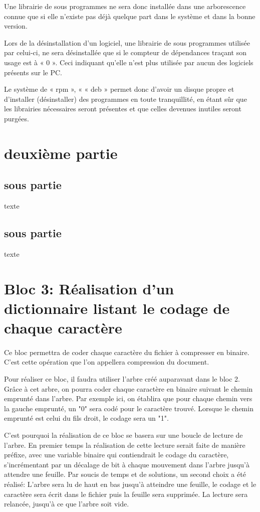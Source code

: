 \documentclass[a4paper,10pt]{article}
\begin{document}
Une librairie de sous programmes ne sera donc installée dans une arborescence connue que si elle n’existe pas déjà quelque part dans le système et dans la bonne version.

Lors de la désinstallation d’un logiciel, une librairie de sous programmes utilisée par celui-ci, ne sera désinstallée que si le compteur de dépendances traçant son usage est à « 0 ». Ceci indiquant qu’elle n’est plus utilisée par aucun des logiciels présents sur le PC.

Le système de « rpm », « « deb » permet donc d’avoir un disque propre et d’installer (désinstaller) des programmes en toute tranquillité, en étant sûr que les librairies nécessaires seront présentes et que celles devenues inutiles seront purgées.


\section{deuxième partie}

\subsection{sous partie}

texte

\subsection{sous partie}

texte

\section{Bloc 3: Réalisation d'un dictionnaire listant le codage de chaque caractère}

\paragraph{}

Ce bloc permettra de coder chaque caractère du fichier à compresser en binaire. C'est cette opération que l'on appellera compression du document.

Pour réaliser ce bloc, il faudra utiliser l'arbre créé auparavant dans le bloc 2. Grâce à cet arbre, on pourra coder chaque caractère en binaire suivant le chemin emprunté dans l'arbre.
Par exemple ici, on établira que pour chaque chemin vers la gauche emprunté, un "0" sera codé pour le caractère trouvé. Lorsque le chemin emprunté est celui du fils droit, le codage sera un "1".

C'est pourquoi la réalisation de ce bloc se basera sur une boucle de lecture de l'arbre. En premier temps la réalisation de cette lecture serait faite de manière préfixe, avec une variable binaire qui contiendrait le codage du caractère, s'incrémentant par un décalage de bit à chaque mouvement dans l'arbre jusqu'à attendre une feuille. Par soucis de temps et de solutions, un second choix a été réalisé: L'arbre sera lu de haut en bas jusqu'à atteindre une feuille, le codage et le caractère sera écrit dans le fichier puis la feuille sera supprimée. La lecture sera relancée, jusqu'à ce que l'arbre soit vide.
\end{document}
